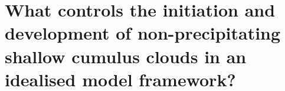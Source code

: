 \documentclass[12pt]{report}
\begin{document}
%

%


\chapter{What controls the initiation and development of non-precipitating shallow cumulus clouds in an idealised model framework?}
%

%
%
\cleardoublepage




%
%
%



%


\end{document}
